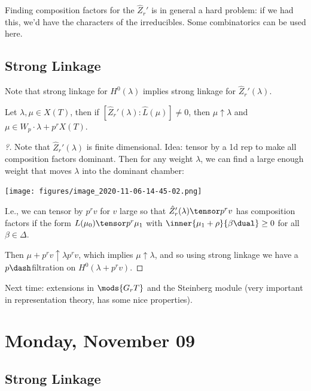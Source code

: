 Finding composition factors for the \(\hat{Z}_r'\) is in general a hard
problem: if we had this, we'd have the characters of the irreducibles.
Some combinatorics can be used here.

\hypertarget{strong-linkage-1}{%
\subsection{Strong Linkage}\label{strong-linkage-1}}

Note that strong linkage for \(H^0(\lambda)\) implies strong linkage for
\(\hat{Z}_r'(\lambda)\).

\begin{theorem}[?]

Let \(\lambda, \mu \in X(T)\), then if
\([\hat{Z}_r'(\lambda): \hat{L}(\mu)] \neq 0\), then
\(\mu\uparrow\lambda\) and \(\mu\in W_p\cdot\lambda + p^r X(T)\).

\end{theorem}

\begin{proof}[?]

Note that \(\hat{Z}_r'(\lambda)\) is finite dimensional. Idea: tensor by
a 1d rep to make all composition factors dominant. Then for any weight
\(\lambda\), we can find a large enough weight that moves \(\lambda\)
into the dominant chamber:

\texttt{[image: figures/image\_2020-11-06-14-45-02.png]}

I.e., we can tensor by \(p^r v\) for \(v\) large so that
\(\hat{Z}_r'(\lambda) \tensor p^r v\) has composition factors if the
form \(L(\mu_0) \tensor p^r \mu_1\) with
\(\inner{\mu_1 + \rho}{\beta\dual} \geq 0\) for all \(\beta\in\Delta\).

Then \(\mu + p^r v \uparrow \lambda p^r v\), which implies
\(\mu\uparrow \lambda\), and so using strong linkage we have a
\(p\dash\)filtration on \(H^0(\lambda + p^r v)\).

\end{proof}

Next time: extensions in \(\mods{G_r T}\) and the Steinberg module (very
important in representation theory, has some nice properties).

\hypertarget{monday-november-09}{%
\section{Monday, November 09}\label{monday-november-09}}

\hypertarget{strong-linkage-2}{%
\subsection{Strong Linkage}\label{strong-linkage-2}}

